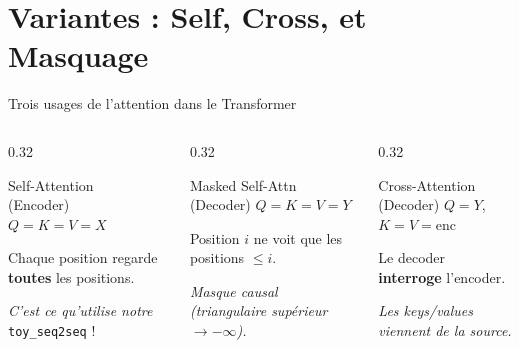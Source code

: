 \documentclass[aspectratio=169, 11pt]{beamer}
\begin{document}
\section{Variantes : Self, Cross, et Masquage}

\begin{frame}{Trois usages de l'attention dans le Transformer}
\begin{columns}
\begin{column}{0.32\textwidth}
    \begin{block}{\centering Self-Attention\\(Encoder)}
    \centering
    $Q = K = V = X$
    
    \vspace{0.3em}
    \footnotesize
    Chaque position regarde \textbf{toutes} les positions.
    
    \vspace{0.3em}
    \textit{C'est ce qu'utilise notre} \texttt{toy\_seq2seq} !
    \end{block}
\end{column}
\begin{column}{0.32\textwidth}
    \begin{block}{\centering Masked Self-Attn\\(Decoder)}
    \centering
    $Q = K = V = Y$
    
    \vspace{0.3em}
    \footnotesize
    Position $i$ ne voit que les positions $\leq i$.
    
    \vspace{0.3em}
    \textit{Masque causal (triangulaire supérieur $\rightarrow -\infty$).}
    \end{block}
\end{column}
\begin{column}{0.32\textwidth}
    \begin{block}{\centering Cross-Attention\\(Decoder)}
    \centering
    $Q = Y$, $K = V = \text{enc}$
    
    \vspace{0.3em}
    \footnotesize
    Le decoder \textbf{interroge} l'encoder.
    
    \vspace{0.3em}
    \textit{Les keys/values viennent de la source.}
    \end{block}
\end{column}
\end{columns}


\end{frame}
\end{document}
